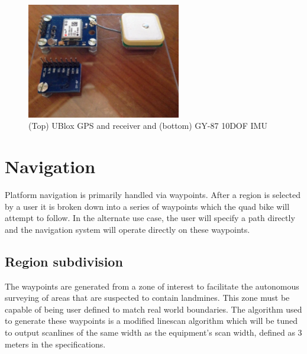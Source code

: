 \documentclass[main.tex]{subfiles}
\begin{document}
\begin{figure}[ht]
\includegraphics[width=0.6\textwidth]{4-DetailedDesign/Positioning.jpg}
\centering
\caption{(Top) UBlox GPS and receiver and (bottom) GY-87 10DOF IMU} 
\end{figure}

\section{Navigation}
Platform navigation is primarily handled via waypoints. After a region is selected by a user it is broken down into a series of waypoints which the quad bike will attempt to follow. In the alternate use case, the user will specify a path directly and the navigation system will operate directly on these waypoints.

\subsection{Region subdivision}
The waypoints are generated from a zone of interest to facilitate the autonomous surveying of areas that are suspected to contain landmines. This zone must be capable of being user defined to match real world boundaries. The algorithm used to generate these waypoints is a modified linescan algorithm which will be tuned to output scanlines of the same width as the equipment's scan width, defined as 3 meters in the specifications.
\end{document}
